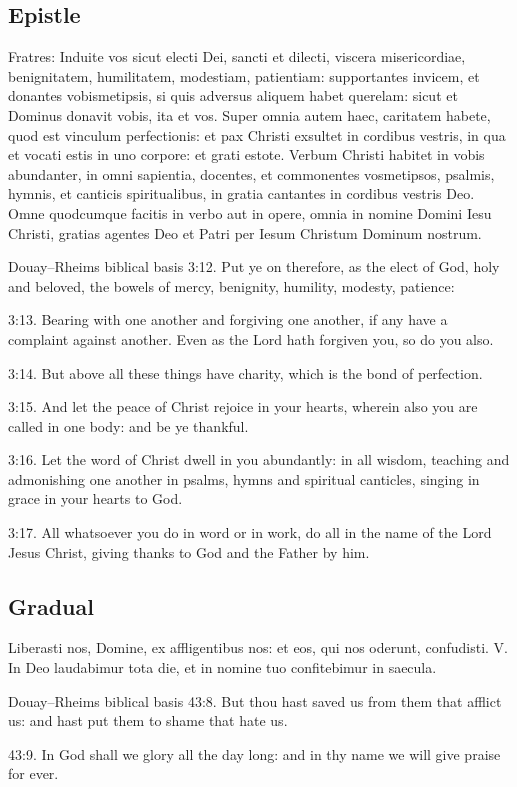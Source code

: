 \subsection{Epistle}
\label{proper-epistle}
\begin{latinproper}
Fratres: Induite vos sicut electi Dei, sancti et dilecti, viscera misericordiae, benignitatem, humilitatem, modestiam, patientiam: supportantes invicem, et donantes vobismetipsis, si quis adversus aliquem habet querelam: sicut et Dominus donavit vobis, ita et vos. Super omnia autem haec, caritatem habete, quod est vinculum perfectionis: et pax Christi exsultet in cordibus vestris, in qua et vocati estis in uno corpore: et grati estote. Verbum Christi habitet in vobis abundanter, in omni sapientia, docentes, et commonentes vosmetipsos, psalmis, hymnis, et canticis spiritualibus, in gratia cantantes in cordibus vestris Deo. Omne quodcumque facitis in verbo aut in opere, omnia in nomine Domini Iesu Christi, gratias agentes Deo et Patri per Iesum Christum Dominum nostrum.
\end{latinproper}
\begin{englishwitness}{Douay--Rheims biblical basis}
3:12. Put ye on therefore, as the elect of God, holy and beloved, the
bowels of mercy, benignity, humility, modesty, patience:

3:13. Bearing with one another and forgiving one another, if any have a
complaint against another. Even as the Lord hath forgiven you, so do
you also.

3:14. But above all these things have charity, which is the bond of
perfection.

3:15. And let the peace of Christ rejoice in your hearts, wherein also
you are called in one body: and be ye thankful.

3:16. Let the word of Christ dwell in you abundantly: in all wisdom,
teaching and admonishing one another in psalms, hymns and spiritual
canticles, singing in grace in your hearts to God.

3:17. All whatsoever you do in word or in work, do all in the name of
the Lord Jesus Christ, giving thanks to God and the Father by him.
\end{englishwitness}

\subsection{Gradual}
\label{proper-gradual}
\begin{latinproper}
Liberasti nos, Domine, ex affligentibus nos: et eos, qui nos oderunt, confudisti. V. In Deo laudabimur tota die, et in nomine tuo confitebimur in saecula.
\end{latinproper}
\begin{englishwitness}{Douay--Rheims biblical basis}
43:8. But thou hast saved us from them that afflict us: and hast put
them to shame that hate us.

43:9. In God shall we glory all the day long: and in thy name we will
give praise for ever.
\end{englishwitness}

